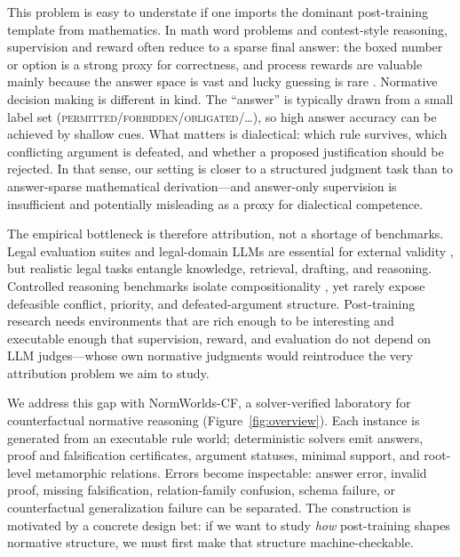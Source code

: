 \documentclass[letterpaper]{article}
\newcommand{\dataset}{NormWorlds-CF}
\newcommand{\lab}[1]{\textsc{#1}}
\begin{document}
This problem is easy to understate if one imports the dominant post-training template from mathematics. In math word problems and contest-style reasoning, supervision and reward often reduce to a sparse final answer: the boxed number or option is a strong proxy for correctness, and process rewards are valuable mainly because the answer space is vast and lucky guessing is rare \cite{cobbe2021gsm8k,lightman2023letsverify,shao2024deepseekmath}. Normative decision making is different in kind. The ``answer'' is typically drawn from a small label set (\lab{permitted}/\lab{forbidden}/\lab{obligated}/\ldots), so high answer accuracy can be achieved by shallow cues. What matters is dialectical: which rule survives, which conflicting argument is defeated, and whether a proposed justification should be rejected. In that sense, our setting is closer to a structured judgment task than to answer-sparse mathematical derivation---and answer-only supervision is insufficient and potentially misleading as a proxy for dialectical competence.

The empirical bottleneck is therefore attribution, not a shortage of benchmarks. Legal evaluation suites and legal-domain LLMs are essential for external validity \cite{chalkidis2022lexglue,guha2023legalbench,fei2024lawbench,colombo2024saullm}, but realistic legal tasks entangle knowledge, retrieval, drafting, and reasoning. Controlled reasoning benchmarks isolate compositionality \cite{weston2015babi,johnson2017clevr,clark2020transformers,tafjord2021proofwriter}, yet rarely expose defeasible conflict, priority, and defeated-argument structure. Post-training research needs environments that are rich enough to be interesting and executable enough that supervision, reward, and evaluation do not depend on LLM judges---whose own normative judgments would reintroduce the very attribution problem we aim to study.

We address this gap with \dataset, a solver-verified laboratory for counterfactual normative reasoning (Figure~\ref{fig:overview}). Each instance is generated from an executable rule world; deterministic solvers emit answers, proof and falsification certificates, argument statuses, minimal support, and root-level metamorphic relations. Errors become inspectable: answer error, invalid proof, missing falsification, relation-family confusion, schema failure, or counterfactual generalization failure can be separated. The construction is motivated by a concrete design bet: if we want to study \emph{how} post-training shapes normative structure, we must first make that structure machine-checkable.
\end{document}
